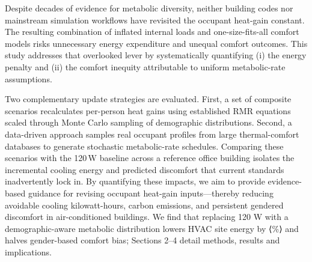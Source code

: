 Despite decades of evidence for metabolic diversity, neither building codes nor mainstream simulation workflows have revisited the occupant heat-gain constant.  The resulting combination of inflated internal loads and one-size-fits-all comfort models risks unnecessary energy expenditure and unequal comfort outcomes.  This study addresses that overlooked lever by systematically quantifying (i) the energy penalty and (ii) the comfort inequity attributable to uniform metabolic-rate assumptions.

Two complementary update strategies are evaluated.  First, a set of composite scenarios recalculates per-person heat gains using established RMR equations scaled through Monte Carlo sampling of demographic distributions.  Second, a data-driven approach samples real occupant profiles from large thermal-comfort databases to generate stochastic metabolic-rate schedules.  Comparing these scenarios with the 120\,W baseline across a reference office building isolates the incremental cooling energy and predicted discomfort that current standards inadvertently lock in.  By quantifying these impacts, we aim to provide evidence-based guidance for revising occupant heat-gain inputs—thereby reducing avoidable cooling kilowatt-hours, carbon emissions, and persistent gendered discomfort in air-conditioned buildings. We find that replacing 120 W with a demographic-aware metabolic distribution lowers HVAC site energy by ⟨\%⟩ and halves gender-based comfort bias; Sections 2–4 detail methods, results and implications.
